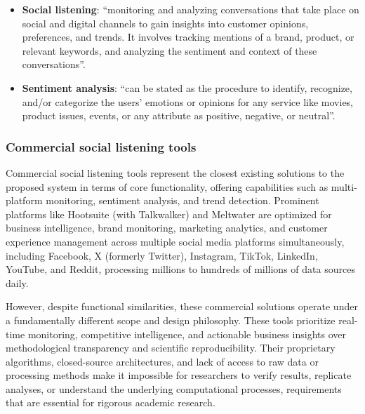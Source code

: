 \begin{itemize}
	\item \textbf{Social listening}: \enquote{monitoring and analyzing conversations that take place on social and digital channels to gain insights into customer opinions, preferences, and trends. It involves tracking mentions of a brand, product, or relevant keywords, and analyzing the sentiment and context of these conversations}. \parencite{emplifi_sociallistening}

	\item \textbf{Sentiment analysis}: \enquote{can be stated as the procedure to identify, recognize, and/or categorize the users' emotions or opinions for any service like movies, product issues, events, or any attribute as positive, negative, or neutral}. \parencite{bordoloi2023sentiment}

\end{itemize}

\subsubsection{Commercial social listening tools}

Commercial social listening tools represent the closest existing solutions to the proposed system in terms of core functionality, offering capabilities such as multi-platform monitoring, sentiment analysis, and trend detection. Prominent platforms like Hootsuite (with Talkwalker) and Meltwater are optimized for business intelligence, brand monitoring, marketing analytics, and customer experience management across multiple social media platforms simultaneously, including Facebook, X (formerly Twitter), Instagram, TikTok, LinkedIn, YouTube, and Reddit, processing millions to hundreds of millions of data sources daily.

However, despite functional similarities, these commercial solutions operate under a fundamentally different scope and design philosophy. These tools prioritize real-time monitoring, competitive intelligence, and actionable business insights over methodological transparency and scientific reproducibility. Their proprietary algorithms, closed-source architectures, and lack of access to raw data or processing methods make it impossible for researchers to verify results, replicate analyses, or understand the underlying computational processes, requirements that are essential for rigorous academic research.

